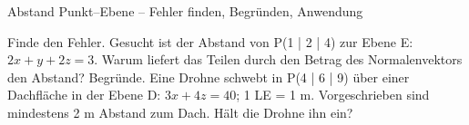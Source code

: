\begin{aufgabe}{Abstand Punkt–Ebene – Fehler finden, Begründen, Anwendung}
\begin{teile}
\teil Finde den Fehler. Gesucht ist der Abstand von P(1 | 2 | 4) zur Ebene E: $2x + y + 2z = 3$. 
\teil Warum liefert das Teilen durch den Betrag des Normalenvektors den Abstand? Begründe.
\teil Eine Drohne schwebt in P(4 | 6 | 9) über einer Dachfläche in der Ebene D: $3x + 4z = 40$; 1 LE = 1 m. Vorgeschrieben sind mindestens 2 m Abstand zum Dach. Hält die Drohne ihn ein? \janein
\end{teile}
\end{aufgabe}
